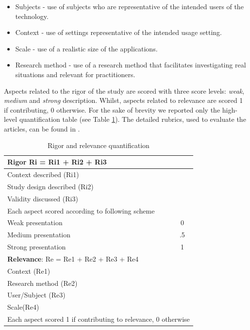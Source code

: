 \documentclass[final,5p,times,twocolumn]{elsarticle}
\begin{document}
\begin{itemize}

\item Subjects - use of subjects who are representative of the intended users of the technology.
\item Context - use of settings representative of the intended usage setting.
\item Scale - use of a realistic size of the applications.
\item Research method - use of a research method that facilitates investigating real situations and relevant for practitioners.
\end {itemize}

Aspects related to the rigor of the study are scored with three score levels: \textit{weak}, \textit{medium} and \textit{strong} description. Whilst, aspects related to relevance are scored 1 if contributing, 0 otherwise. For the sake of brevity we reported only the high-level quantification table (see Table \ref{tab:ms:quantific-relev-rig}). The detailed rubrics, used to evaluate the articles, can be found in \cite{Ivarsson2010}.

\begin{table}[H]
\renewcommand{\arraystretch}{1.1}

\caption{Rigor and relevance quantification}
\label{tab:ms:quantific-relev-rig}
\centering
\scriptsize\begin{tabular}{|lc|}

\hline
\hline 
\multicolumn{2}{|l|}{ \textbf{Rigor} Ri =  Ri1 + Ri2 + Ri3} \\
\hline 
Context described (Ri1) &    \\
Study design described (Ri2) &    \\
Validity discussed (Ri3) &    \\
\hline
\multicolumn{2}{|l|}{Each aspect scored according to following scheme } \\ \hline
Weak presentation & 0 \\
Medium presentation & .5 \\
Strong presentation & 1 \\
\hline


\hline \hline


\multicolumn{2}{|l|}{ \textbf{Relevance}: Re =  Re1 + Re2 + Re3 + Re4} \\
\hline 
Context (Re1) &    \\
Research method (Re2) &    \\
User/Subject (Re3) &    \\
Scale(Re4) &    \\
\hline
\multicolumn{2}{|l|}{Each aspect scored 1 if contributing to relevance, 0 otherwise} \\ 
\hline
\hline

 \end{tabular}
 \end{table}
\end{document}
